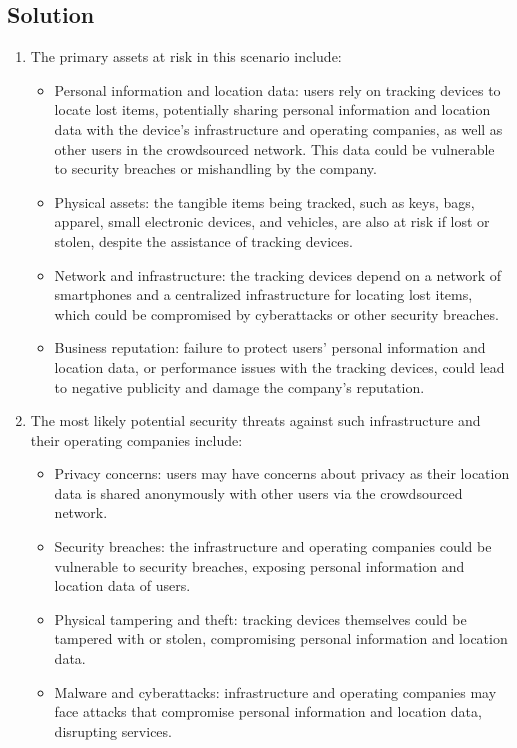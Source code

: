 \subsection*{Solution}
\begin{enumerate}
    \item The primary assets at risk in this scenario include:
        \begin{itemize}
            \item Personal information and location data: users rely on tracking devices to locate lost items, potentially sharing personal information and location data with the device's infrastructure and operating companies, as well as other users in the crowdsourced network. 
                This data could be vulnerable to security breaches or mishandling by the company.
            \item Physical assets: the tangible items being tracked, such as keys, bags, apparel, small electronic devices, and vehicles, are also at risk if lost or stolen, despite the assistance of tracking devices.
            \item Network and infrastructure: the tracking devices depend on a network of smartphones and a centralized infrastructure for locating lost items, which could be compromised by cyberattacks or other security breaches.
            \item Business reputation: failure to protect users' personal information and location data, or performance issues with the tracking devices, could lead to negative publicity and damage the company's reputation.
        \end{itemize}
    \item The most likely potential security threats against such infrastructure and their operating companies include:
        \begin{itemize}
            \item Privacy concerns: users may have concerns about privacy as their location data is shared anonymously with other users via the crowdsourced network.
            \item Security breaches: the infrastructure and operating companies could be vulnerable to security breaches, exposing personal information and location data of users.
            \item Physical tampering and theft: tracking devices themselves could be tampered with or stolen, compromising personal information and location data.
            \item Malware and cyberattacks: infrastructure and operating companies may face attacks that compromise personal information and location data, disrupting services.

\end{itemize}
\end{enumerate}
